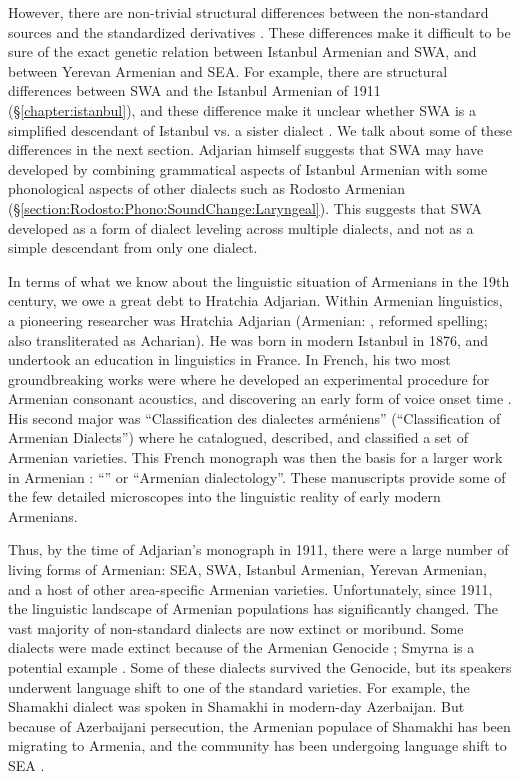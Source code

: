 However, there are non-trivial structural differences between the non-standard sources and the standardized derivatives \citep{SayeedVaux-2017-EvolutionArmenian}. These differences make it difficult to be sure of the exact genetic relation between Istanbul Armenian and SWA, and between Yerevan Armenian and SEA. For example, there are structural differences between SWA and the Istanbul Armenian of 1911 (\S\ref{chapter:istanbul}), and these difference make it unclear whether SWA is a simplified descendant of Istanbul vs. a sister dialect  \citep[1148]{SayeedVaux-2017-EvolutionArmenian}. We talk about some of these differences in the next section. Adjarian himself suggests that SWA may have developed by combining grammatical aspects of Istanbul Armenian with some phonological aspects of other dialects such as Rodosto Armenian (\S\ref{section:Rodosto:Phono:SoundChange:Laryngeal}). This suggests that SWA developed as a form of dialect leveling across multiple dialects, and not as a simple descendant from only one dialect. 

In terms of what we know about the linguistic situation of Armenians in the 19th century, we owe a great debt to Hratchia Adjarian. Within Armenian linguistics, a pioneering researcher was Hratchia Adjarian (Armenian: , reformed spelling; also transliterated as Acharian). He was born in modern Istanbul in 1876, and undertook an education in linguistics in France. In French, his two most groundbreaking works were \citet{Adjarian-1899-ArmenianExplosives} where he developed an experimental procedure for Armenian consonant acoustics, and discovering an early form of voice onset time \citep{braun-2013-earlyCaseVOTAdjarian}. His second major was \citet{Adjarian-1909-ClassificationArmenianDialect} ``Classification des dialectes arméniens'' (``Classification of Armenian Dialects'') where he catalogued, described, and classified a set of Armenian varieties. This French monograph was then the basis for a larger work in Armenian \citep{Adjarian-1911-DialectologyBook}: ``'' or ``Armenian dialectology''. These manuscripts provide some of the few detailed microscopes into the linguistic reality of early modern Armenians. 

Thus, by the time of Adjarian's monograph in 1911, there were a large number of living forms of Armenian: SEA, SWA, Istanbul Armenian, Yerevan Armenian, and a host of other area-specific Armenian varieties. Unfortunately, since 1911, the linguistic landscape of Armenian populations has significantly changed. The vast majority of non-standard dialects are now extinct or moribund. Some dialects were made extinct because of the Armenian Genocide \citep{Katvalyan-2015-GenocideArmenianLanguage}; Smyrna is a potential example \citep{Vaux-2012-ArmenianSmyrna}. Some of these dialects survived the Genocide, but its speakers underwent language shift to one of the standard varieties. For example, the Shamakhi dialect was spoken in Shamakhi in modern-day Azerbaijan. But because of Azerbaijani persecution, the Armenian populace of Shamakhi has been migrating to Armenia, and the community has been undergoing language shift to SEA \citep{Vlasyan-2019-Shamakhi}. 

